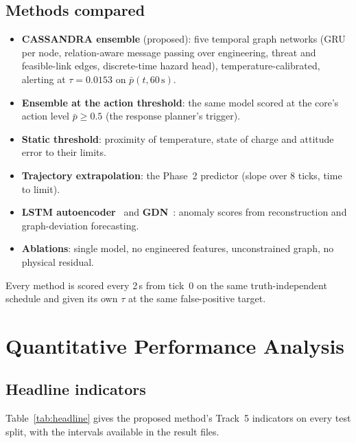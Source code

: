 \documentclass[10pt,a4paper]{article}
\begin{document}
\subsection{Methods compared}
\begin{itemize}
\item \textbf{CASSANDRA ensemble} (proposed): five temporal graph networks (GRU per node, relation-aware
message passing over engineering, threat and feasible-link edges, discrete-time hazard head),
temperature-calibrated, alerting at $\tau=0.0153$ on $\bar p(t,60\,\mathrm{s})$.
\item \textbf{Ensemble at the action threshold}: the same model scored at the core's action level
$\bar p\ge 0.5$ (the response planner's trigger).
\item \textbf{Static threshold}: proximity of temperature, state of charge and attitude error to their limits.
\item \textbf{Trajectory extrapolation}: the Phase~2 predictor (slope over 8 ticks, time to limit).
\item \textbf{LSTM autoencoder}~\cite{malhotra2016lstmed} and \textbf{GDN}~\cite{deng2021gdn}: anomaly
scores from reconstruction and graph-deviation forecasting.
\item \textbf{Ablations}: single model, no engineered features, unconstrained graph, no physical residual.
\end{itemize}
Every method is scored every 2\,s from tick~0 on the same truth-independent schedule and given its own
$\tau$ at the same false-positive target.

\section{Quantitative Performance Analysis}
\label{sec:quant}

\subsection{Headline indicators}
Table~\ref{tab:headline} gives the proposed method's Track~5 indicators on every test split, with the
intervals available in the result files.
\end{document}
